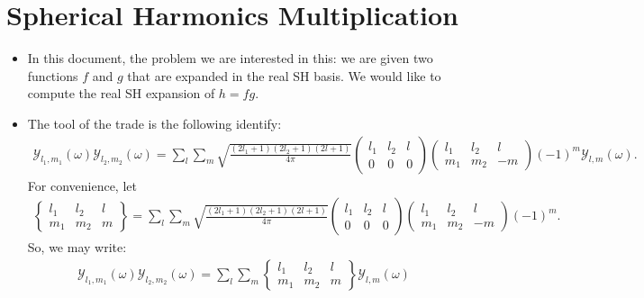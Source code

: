 \documentclass[10pt]{article}
\begin{document}
	\section{Spherical Harmonics Multiplication}

	\begin{itemize}
		\item In this document, the problem we are interested in this: we are given two functions $f$ and $g$ that are expanded in the real SH basis.  We would like to compute the real SH expansion of $h = fg$.

		\item The tool of the trade is the following identify:
		\begin{align*}
			\mathcal{Y}_{l_1, m_1}(\omega) \mathcal{Y}_{l_2, m_2}(\omega) 
			= \sum_{l} \sum_{m} \sqrt{\frac{(2l_1+1)(2l_2+1)(2l + 1)}{4\pi}}
			\begin{pmatrix}
				l_1 & l_2 & l \\ 0 & 0 & 0 
			\end{pmatrix}
			\begin{pmatrix}
				l_1 & l_2 & l \\ m_1 & m_2 & -m
			\end{pmatrix}
			(-1)^m
			\mathcal{Y}_{l,m}(\omega).
		\end{align*}
		For convenience, let
		\begin{align*}
			\begin{Bmatrix}
				l_1 & l_2 & l \\ m_1 & m_2 & m
			\end{Bmatrix}
			 = \sum_{l} \sum_{m} \sqrt{\frac{(2l_1+1)(2l_2+1)(2l + 1)}{4\pi}}
			\begin{pmatrix}
				l_1 & l_2 & l \\ 0 & 0 & 0 
			\end{pmatrix}
			\begin{pmatrix}
				l_1 & l_2 & l \\ m_1 & m_2 & -m
			\end{pmatrix}
			(-1)^m.
		\end{align*}
		So, we may write:
		\begin{align*}
			\mathcal{Y}_{l_1, m_1}(\omega) \mathcal{Y}_{l_2, m_2}(\omega) 
			= \sum_{l} \sum_{m} 
			\begin{Bmatrix}
				l_1 & l_2 & l \\ m_1 & m_2 & m
			\end{Bmatrix}
			\mathcal{Y}_{l,m}(\omega)
		\end{align*}		
		

\end{itemize}
\end{document}
